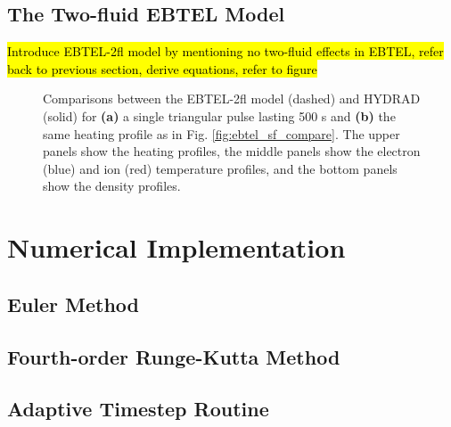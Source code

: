 \subsection{The Two-fluid EBTEL Model}
\label{subsec:two_fluid_ebtel}
%
\par\hl{Introduce EBTEL-2fl model by mentioning no two-fluid effects in EBTEL, refer back to previous section, derive equations, refer to figure}
%
\begin{figure}
	\centering
	\caption{Comparisons between the EBTEL-2fl model (dashed) and HYDRAD (solid) for \textbf{(a)} a single triangular pulse lasting 500 s and \textbf{(b)} the same heating profile as in Fig. \ref{fig:ebtel_sf_compare}. The upper panels show the heating profiles, the middle panels show the electron (blue) and ion (red) temperature profiles, and the bottom panels show the density profiles.}
	\label{fig:ebtel_tf_compare}
\end{figure}
%
\section{Numerical Implementation}
\label{sec:numerical}
%
\subsection{Euler Method}
\label{subsec:euler}
%
\subsection{Fourth-order Runge-Kutta Method}
\label{subsec:rk4}
%
\subsection{Adaptive Timestep Routine}
\label{subsec:adapt}
%